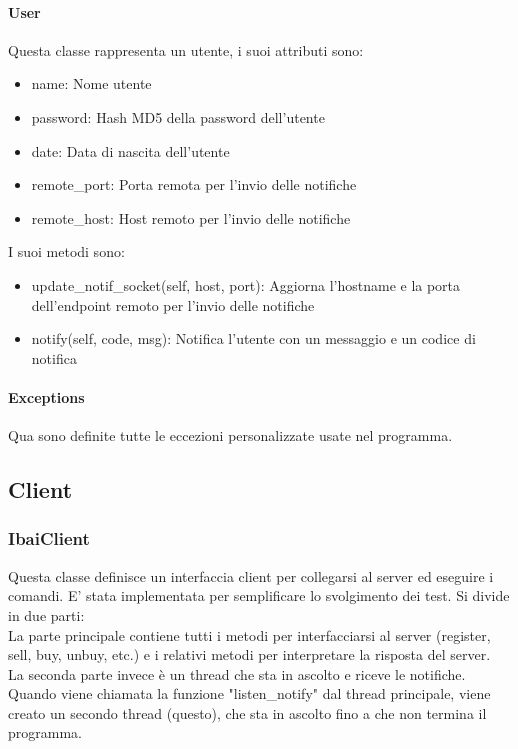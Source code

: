 \paragraph{\textbf{User}}
Questa classe rappresenta un utente, i suoi attributi sono:
\begin{itemize}
\item{name}: Nome utente
\item{password}: Hash MD5 della password dell'utente
\item{date}: Data di nascita dell'utente
\item{remote\_port}: Porta remota per l'invio delle notifiche
\item{remote\_host}: Host remoto per l'invio delle notifiche
\end{itemize}
I suoi metodi sono:
\begin{itemize}
\item{update\_notif\_socket(self, host, port)}: Aggiorna l'hostname e la porta dell'endpoint remoto per l'invio delle notifiche
\item{notify(self, code, msg)}: Notifica l'utente con un messaggio e un codice di notifica
\end{itemize}
\paragraph{Exceptions}
Qua sono definite tutte le eccezioni personalizzate usate nel programma.
\subsection{Client}
\subsubsection{IbaiClient}
Questa classe definisce un interfaccia client per collegarsi al server ed eseguire i comandi. E' stata implementata per semplificare lo svolgimento dei test.
Si divide in due parti:\\
La parte principale contiene tutti i metodi per interfacciarsi al server (register, sell, buy, unbuy, etc.) e i relativi metodi per interpretare la risposta del server.\\
La seconda parte invece è un thread che  sta in ascolto e riceve le notifiche. Quando viene chiamata la funzione "listen\_notify" dal thread principale, viene creato un secondo thread (questo), che sta in ascolto fino a che non termina il programma.
